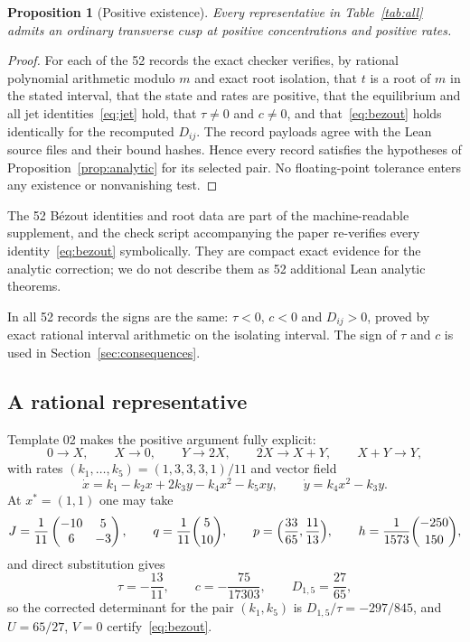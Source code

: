 \documentclass[11pt,a4paper]{article}
\theoremstyle{plain}
\newtheorem{proposition}[theorem]{Proposition}
\theoremstyle{definition}
\theoremstyle{remark}
\numberwithin{equation}{section}
\begin{document}
\begin{proposition}[Positive existence]\label{prop:positive}
Every representative in Table~\ref{tab:all} admits an ordinary transverse cusp at positive concentrations and positive rates.
\end{proposition}
\begin{proof}
For each of the 52 records the exact checker verifies, by rational polynomial arithmetic modulo $m$ and exact root isolation, that $t$ is a root of $m$ in the stated interval, that the state and rates are positive, that the equilibrium and all jet identities~\eqref{eq:jet} hold, that $\tau\ne0$ and $c\ne0$, and that~\eqref{eq:bezout} holds identically for the recomputed $D_{ij}$. The record payloads agree with the Lean source files and their bound hashes. Hence every record satisfies the hypotheses of Proposition~\ref{prop:analytic} for its selected pair. No floating-point tolerance enters any existence or nonvanishing test.
\end{proof}

The 52 B\'ezout identities and root data are part of the machine-readable supplement, and the check script accompanying the paper re-verifies every identity~\eqref{eq:bezout} symbolically. They are compact exact evidence for the analytic correction; we do not describe them as 52 additional Lean analytic theorems.

In all 52 records the signs are the same: $\tau<0$, $c<0$ and $D_{ij}>0$, proved by exact rational interval arithmetic on the isolating interval. The sign of $\tau$ and $c$ is used in Section~\ref{sec:consequences}.

\subsection{A rational representative}\label{sec:example}
Template 02 makes the positive argument fully explicit:
\begin{equation}\label{eq:example}
 0\to X,\qquad X\to0,\qquad Y\to2X,\qquad 2X\to X+Y,\qquad X+Y\to Y,
\end{equation}
with rates $(k_1,\dots,k_5)=(1,3,3,3,1)/11$ and vector field
\begin{equation}\label{eq:examplefield}
 \dot x=k_1-k_2x+2k_3y-k_4x^2-k_5xy,\qquad \dot y=k_4x^2-k_3y .
\end{equation}
At $x^*=(1,1)$ one may take
\[
 J=\frac1{11}\begin{pmatrix}-10&5\\6&-3\end{pmatrix},\qquad
 q=\frac1{11}\binom{5}{10},\qquad
 p=\Bigl(\frac{33}{65},\frac{11}{13}\Bigr),\qquad
 h=\frac1{1573}\binom{-250}{150},
\]
and direct substitution gives
\[
 \tau=-\frac{13}{11},\qquad c=-\frac{75}{17303},\qquad D_{1,5}=\frac{27}{65},
\]
so the corrected determinant for the pair $(k_1,k_5)$ is $D_{1,5}/\tau=-297/845$, and $U=65/27$, $V=0$ certify~\eqref{eq:bezout}.
\end{document}

